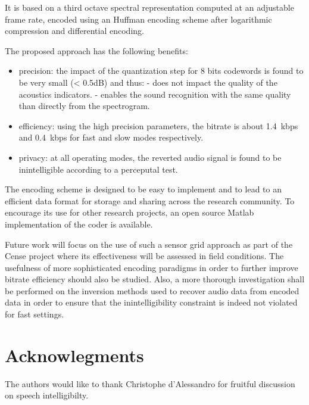 \documentclass[sensors,article,submit,moreauthors,pdftex,10pt,a4paper]{mdpi}
\begin{document}
It is based on a third octave spectral representation computed at an adjustable frame rate, encoded using an Huffman encoding scheme after logarithmic compression and differential encoding.

The proposed approach has the following benefits:
\begin{itemize}
	\item precision: the impact of the quantization step for 8 bits codewords is found to be very small (< 0.5dB) and thus:
	- does not impact the quality of the acoustics indicators.
	- enables the sound recognition with the same quality than directly from the spectrogram.
	\item efficiency: using the high precision parameters, the bitrate is about 1.4~kbps and 0.4~kbps for fast and slow modes respectively.
	\item privacy: at all operating modes, the reverted audio signal is found to be inintelligible according to a perceputal test.
\end{itemize}

The encoding scheme is designed to be easy to implement and to lead to an efficient data format for storage and sharing across the research community. To encourage its use for other research projects, an open source Matlab implementation of the coder is available.



Future work will focus on the use of such a sensor grid approach as part of the Cense project where its effectiveness will be assessed in field conditions. The usefulness of more sophisticated encoding paradigms in order to further improve bitrate efficiency should also be studied. Also, a more thorough investigation shall be performed on the inversion methods used to recover audio data from encoded data in order to ensure that the inintelligibility constraint is indeed not violated for fast settings.

\section{Acknowlegments}

The authors would like to thank Christophe d'Alessandro for fruitful discussion on speech intelligibilty.

%


\end{document}
